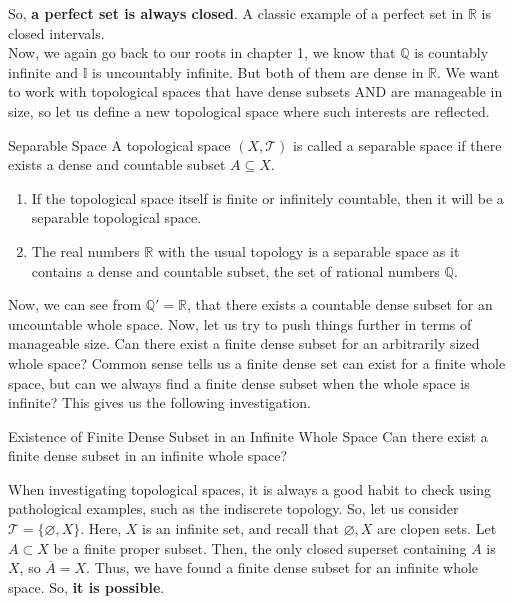 So, \textbf{a perfect set is always closed}. A classic example of a perfect set in $\mathbb{R}$ is closed intervals. \\
Now, we again go back to our roots in chapter 1, we know that $\mathbb{Q}$ is countably infinite and $\mathbb{I}$ is uncountably infinite. But both of them are dense in $\mathbb{R}$. We want to work with topological spaces that have dense subsets AND are manageable in size, so let us define a new topological space where such interests are reflected.
\begin{Definition}{Separable Space}\label{separable_space}
    A topological space $(X,\mathcal{T})$ is called a separable space if there exists a dense and countable subset $A\subseteq X$.
\end{Definition}
\begin{Example}
    \begin{enumerate}
        \item If the topological space itself is finite or infinitely countable, then it will be a separable topological space.
        \item The real numbers $\mathbb{R}$ with the usual topology is a separable space as it contains a dense and countable subset, the set of rational numbers $\mathbb{Q}$.
    \end{enumerate}
\end{Example}
\noindent Now, we can see from $\mathbb{Q}'=\mathbb{R}$, that there exists a countable dense subset for an uncountable whole space. Now, let us try to push things further in terms of manageable size. Can there exist a finite dense subset for an arbitrarily sized whole space? Common sense tells us a finite dense set can exist for a finite whole space, but can we always find a finite dense subset when the whole space is infinite? This gives us the following investigation.
\begin{Query}{Existence of Finite Dense Subset in an Infinite Whole Space}\label{finite_dense_subset_in_infinite_whole_space}
    Can there exist a finite dense subset in an infinite whole space?
\end{Query}
\begin{Investigation}
    When investigating topological spaces, it is always a good habit to check using pathological examples, such as the indiscrete topology. So, let us consider $\mathcal{T}=\{\varnothing,X\}$. Here, $X$ is an infinite set, and recall that $\varnothing, X$ are clopen sets. Let $A\subset X$ be a finite proper subset. Then, the only closed superset containing $A$ is $X$, so $\overline{A}=X$. Thus, we have found a finite dense subset for an infinite whole space. So, \textbf{it is possible}.
\end{Investigation}
